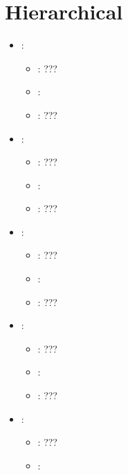 \section{Hierarchical}


\begin{itemize}
    \item {}:
           \begin{itemize}
                \item \optionPossibleValues{}: ???
                \item \optionDefaultValue{}: 
                \item \optionDescrption{}: ???
           \end{itemize}
    \item {}:
           \begin{itemize}
                \item \optionPossibleValues{}: ???
                \item \optionDefaultValue{}: 
                \item \optionDescrption{}: ???
           \end{itemize}
    \item {}:
           \begin{itemize}
                \item \optionPossibleValues{}: ???
                \item \optionDefaultValue{}: 
                \item \optionDescrption{}: ???
           \end{itemize}
    \item {}:
           \begin{itemize}
                \item \optionPossibleValues{}: ???
                \item \optionDefaultValue{}: 
                \item \optionDescrption{}: ???
           \end{itemize}
    \item {}:
           \begin{itemize}
                \item \optionPossibleValues{}: ???
                \item \optionDefaultValue{}: 

\end{itemize}
\end{itemize}
